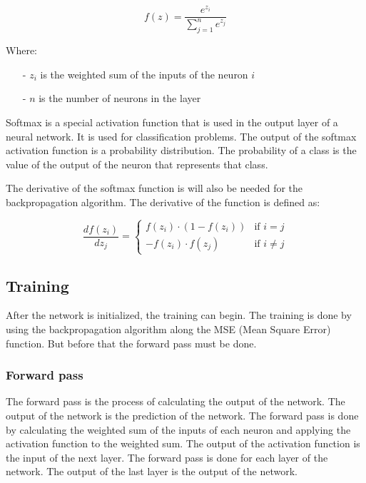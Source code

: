 \begin{equation}
    \label{eq:softmax}
    f(z) = \frac{e^{z_i}}{\sum_{j=1}^n e^{z_j}}
\end{equation}

\noindent
Where:

\begin{itemize}
    \item[-] $z_i$ is the weighted sum of the inputs of the neuron $i$
    \item[-] $n$ is the number of neurons in the layer
\end{itemize}

Softmax is a special activation function that is used in the output layer of a neural network. It is used for
classification problems. The output of the softmax activation function is a probability distribution. The
probability of a class is the value of the output of the neuron that represents that class.

The derivative of the softmax function is will also be needed for the backpropagation algorithm. The derivative
of the function is defined as:

\begin{equation}
    \label{eq:softmax_derivative}
    \frac {df(z_i)}{dz_j} = \begin{cases}
        f(z_i) \cdot (1 - f(z_i)) & \text{if } i = j \\
        -f(z_i) \cdot f(z_j) & \text{if } i \neq j
    \end{cases}
\end{equation}

\subsection{Training}

After the network is initialized, the training can begin. The training is done by using the backpropagation
algorithm along the MSE (Mean Square Error) function. But before that the forward pass must be done.

\subsubsection{Forward pass}

The forward pass is the process of calculating the output of the network. The output of the network is the
prediction of the network. The forward pass is done by calculating the weighted sum of the inputs of each
neuron and applying the activation function to the weighted sum. The output of the activation function is
the input of the next layer. The forward pass is done for each layer of the network. The output of the last
layer is the output of the network.

